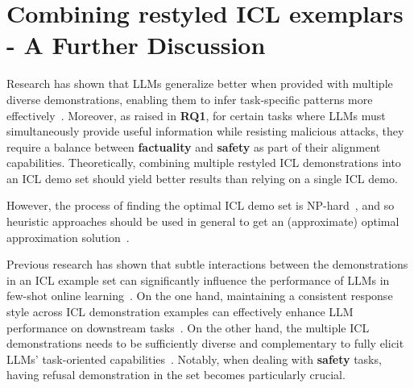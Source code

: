 \section{Combining restyled ICL exemplars - A Further Discussion}
\label{appendix:combine_restyle_dicsuss}

Research has shown that LLMs generalize better when provided with multiple diverse demonstrations, enabling them to infer task-specific patterns more effectively~\citep{brown2020language, DBLP:conf/iclr/LinRLDSCB024}. Moreover, as raised in \textbf{RQ1}, for certain tasks where LLMs must simultaneously provide useful information while resisting malicious attacks, they require a balance between \textbf{\color{myblue} factuality} and \textbf{\color{myred} safety} as part of their alignment capabilities. 
Theoretically, combining multiple restyled ICL demonstrations into an ICL demo set should yield better results than relying on a single ICL demo.

However, the process of finding the optimal ICL demo set is NP-hard~\citep{DBLP:conf/icml/Ye0F0K23}, and so heuristic approaches should be used in general to get an (approximate) optimal approximation solution~\citep{liu2024se2}.

Previous research has shown that subtle interactions between the demonstrations in an ICL example set can significantly influence the performance of LLMs in few-shot online learning~\cite{DBLP:conf/emnlp/HuaQH24}. 
On the one hand, maintaining a consistent response style across ICL demonstration examples can effectively enhance LLM performance on downstream tasks~\citep{DBLP:conf/iclr/LinRLDSCB024,li2024scar}. 
On the other hand, the multiple ICL demonstrations needs to be sufficiently diverse and complementary to fully elicit LLMs' task-oriented capabilities~\citep{min2022rethinking}. 
Notably, when dealing with \textbf{\color{myred} safety} tasks, having refusal demonstration in the set becomes particularly crucial. 

